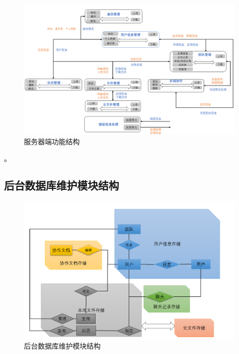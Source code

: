         \newpage
        \begin{figure}[h]
            \centering
            \includegraphics[scale=0.65]{OutlineDesign/figures/服务器端功能结构.png}
            \caption{服务器端功能结构}
            \label{fig:server_flow}
        \end{figure}。
    
    \subsection{后台数据库维护模块结构}
\newpage
        \begin{figure}[h]
            \centering
            \includegraphics[scale=0.75]{OutlineDesign/figures/数据库存储结构.png}
            \caption{后台数据库维护模块结构}
            \label{fig:server_flow}
        \end{figure}
    
